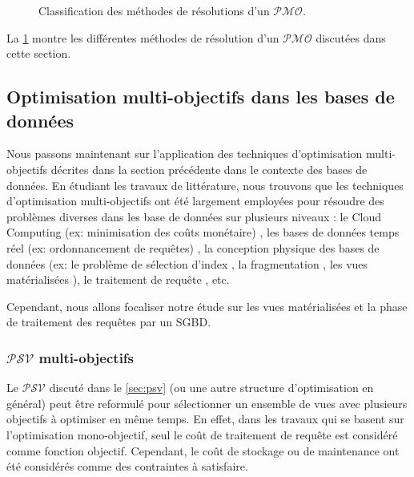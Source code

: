 \begin{figure}
\footnotesize
\begin{center}

\caption{Classification des méthodes de résolutions d'un $\mathcal{PMO}$.}
\label{fig:pmo-classification}
\end{center}
\end{figure}

La \ref{fig:pmo-classification} montre les différentes méthodes de résolution d'un $\mathcal{PMO}$ discutées dans cette section.

\subsection{Optimisation multi-objectifs dans les bases de données}
Nous passons maintenant sur l'application des techniques d'optimisation multi-objectifs décrites dans la section précédente dans le contexte des bases de données. En étudiant les travaux de littérature, nous trouvons que les techniques d'optimisation multi-objectifs ont été largement employées pour résoudre des problèmes diverses dans les base de données sur plusieurs niveaux : le Cloud Computing (ex: minimisation des coûts monétaire) \cite{Kong12,Dokeroglu14,Helff16}, les bases de données temps réel (ex: ordonnancement de requêtes) \cite{Thiele09,Zhao16}, la conception physique des bases de données (ex: le problème de sélection d'index \cite{Bruno11b,Bruno08}, la fragmentation \cite{Bellatreche13b,Bellatreche13c,Barr13}, les vues matérialisées \cite{Lawrence06,Talebian13,Goswami13}), le traitement de requête \cite{Papadimitriou01,Trummer14,Borzsony01}, etc.

Cependant, nous allons focaliser notre étude sur les vues matérialisées et la phase de traitement des requêtes par un SGBD.

\subsubsection{$\mathcal{PSV}$ multi-objectifs}
Le $\mathcal{PSV}$ discuté dans le \ref{sec:psv} (ou une autre structure d'optimisation en général) peut être reformulé pour sélectionner un ensemble de vues avec plusieurs objectifs à optimiser en même temps. En effet, dans les travaux qui se basent sur l'optimisation mono-objectif, seul le coût de traitement de requête est considéré comme fonction objectif. Cependant, le coût de stockage ou de maintenance ont été considérés comme des contraintes à satisfaire.


